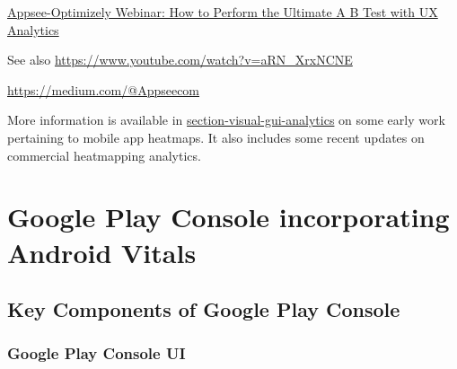 \href{https://youtu.be/GQ2DoINkba4?t=554}{Appsee-Optimizely Webinar: How to Perform the Ultimate A B Test with UX Analytics} %

See also \url{https://www.youtube.com/watch?v=aRN\_XrxNCNE} %


\url{https://medium.com/@Appseecom}



More information is available in \href{section-visual-gui-analytics}{section-visual-gui-analytics} on some early work pertaining to mobile app heatmaps. It also includes some recent updates on commercial heatmapping analytics.

\section{Google Play Console incorporating Android Vitals}\label{google_play_console_section}

\subsection{Key Components of Google Play Console}
\subsubsection{Google Play Console UI}


